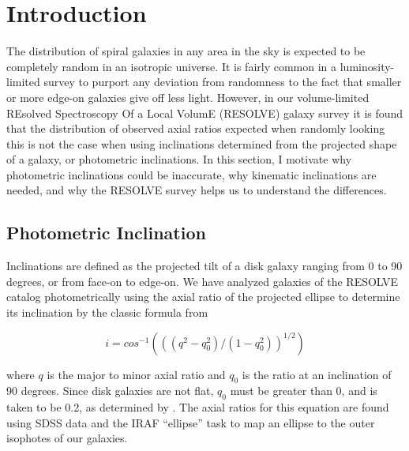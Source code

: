 \documentclass{emulateapj}
\begin{document}

\section{Introduction}

\large The distribution of spiral galaxies in any area in the sky is expected to be completely random in an isotropic universe. It is fairly common in a luminosity-limited survey to purport any deviation from randomness to the fact that smaller or more edge-on galaxies give off less light. However, in our volume-limited REsolved Spectroscopy Of a Local VolumE (RESOLVE) galaxy survey it is found that the distribution of observed axial ratios expected when randomly looking this is not the case when using inclinations determined from the projected shape of a galaxy, or photometric inclinations. In this section, I motivate why photometric inclinations could be inaccurate, why kinematic inclinations are needed, and why the RESOLVE survey helps us to understand the differences.

\subsection{Photometric Inclination}

\large Inclinations are defined as the projected tilt of a disk galaxy ranging from 0 to 90 degrees, or from face-on to edge-on. We have analyzed galaxies of the RESOLVE catalog photometrically using the axial ratio of the projected ellipse to determine its inclination by the classic formula from \citet{hubble}

\begin{equation}
i = cos^{-1}(((q^2-q_0^2)/(1-q_0^2))^{1/2})
\end{equation}

\noindent \large where $q$ is the major to minor axial ratio and $q_0$ is the ratio at an inclination of 90 degrees. Since disk galaxies are not flat, $q_0$ must be greater than 0, and is taken to be 0.2, as determined by \citet{holmberg}. The axial ratios for this equation are found using SDSS data and the IRAF ``ellipse'' task to map an ellipse to the outer isophotes of our galaxies.

\end{document}
